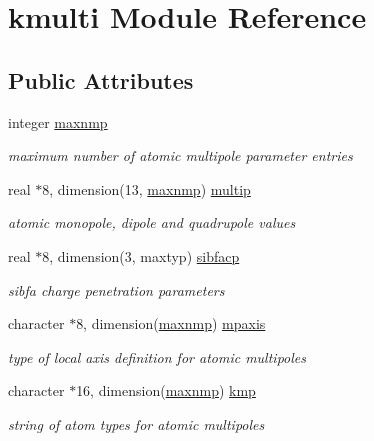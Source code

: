 \hypertarget{classkmulti}{\section{kmulti Module Reference}
\label{classkmulti}
}
\subsection*{Public Attributes}
\begin{DoxyCompactItemize}
\item 
integer \hyperlink{classkmulti_ab7a2af780bd3530132eb0739eed19b48}{maxnmp}
\begin{DoxyCompactList}\small\item\em maximum number of atomic multipole parameter entries \end{DoxyCompactList}\item 
real $\ast$8, dimension(13, \hyperlink{classkmulti_ab7a2af780bd3530132eb0739eed19b48}{maxnmp}) \hyperlink{classkmulti_adcec17ef84782e479d984ba5f8c77c0b}{multip}
\begin{DoxyCompactList}\small\item\em atomic monopole, dipole and quadrupole values \end{DoxyCompactList}\item 
real $\ast$8, dimension(3, maxtyp) \hyperlink{classkmulti_a2844e444f59fa942d7f54b2c0d70813c}{sibfacp}
\begin{DoxyCompactList}\small\item\em sibfa charge penetration parameters \end{DoxyCompactList}\item 
character $\ast$8, dimension(\hyperlink{classkmulti_ab7a2af780bd3530132eb0739eed19b48}{maxnmp}) \hyperlink{classkmulti_a1c8196d3d05fe66d16f34b7ccb986e55}{mpaxis}
\begin{DoxyCompactList}\small\item\em type of local axis definition for atomic multipoles \end{DoxyCompactList}\item 
character $\ast$16, dimension(\hyperlink{classkmulti_ab7a2af780bd3530132eb0739eed19b48}{maxnmp}) \hyperlink{classkmulti_aab33216080234dbed3e2a25133cfa470}{kmp}
\begin{DoxyCompactList}\small\item\em string of atom types for atomic multipoles \end{DoxyCompactList}\end{DoxyCompactItemize}


